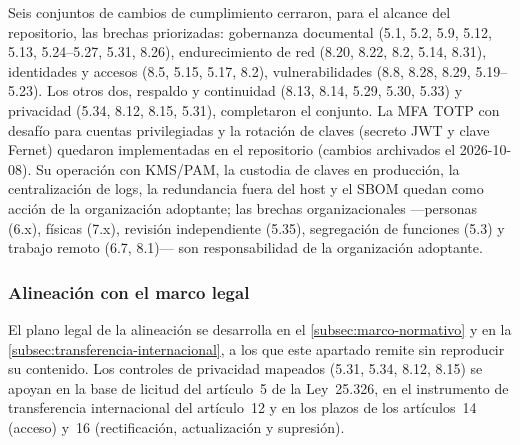 Seis conjuntos de cambios de cumplimiento cerraron, para el alcance del repositorio, las brechas priorizadas: gobernanza documental (5.1, 5.2, 5.9, 5.12, 5.13, 5.24--5.27, 5.31, 8.26), endurecimiento de red (8.20, 8.22, 8.2, 5.14, 8.31), identidades y accesos (8.5, 5.15, 5.17, 8.2), vulnerabilidades (8.8, 8.28, 8.29, 5.19--5.23). Los otros dos, respaldo y continuidad (8.13, 8.14, 5.29, 5.30, 5.33) y privacidad (5.34, 8.12, 8.15, 5.31), completaron el conjunto. La MFA TOTP con desafío para cuentas privilegiadas y la rotación de claves (secreto JWT y clave Fernet) quedaron implementadas en el repositorio (cambios archivados el 2026-10-08). Su operación con KMS/PAM, la custodia de claves en producción, la centralización de logs, la redundancia fuera del host y el SBOM quedan como acción de la organización adoptante; las brechas organizacionales ---personas (6.x), físicas (7.x), revisión independiente (5.35), segregación de funciones (5.3) y trabajo remoto (6.7, 8.1)--- son responsabilidad de la organización adoptante.

\subsubsection{Alineación con el marco legal}\label{subsec:cumplimiento-legal}

El plano legal de la alineación se desarrolla en el \autoref{subsec:marco-normativo} y en la \autoref{subsec:transferencia-internacional}, a los que este apartado remite sin reproducir su contenido. Los controles de privacidad mapeados (5.31, 5.34, 8.12, 8.15) se apoyan en la base de licitud del artículo~5 de la Ley~25.326, en el instrumento de transferencia internacional del artículo~12 y en los plazos de los artículos~14 (acceso) y~16 (rectificación, actualización y supresión).

\newpage
